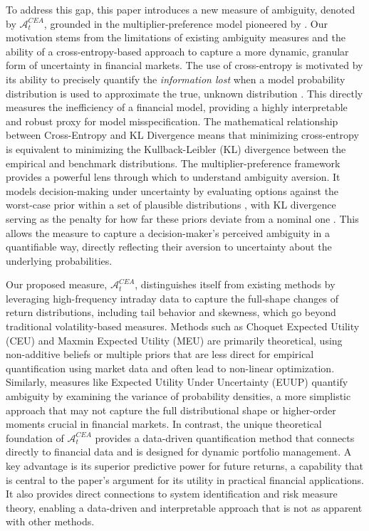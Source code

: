 \documentclass[preprint,12pt,authoryear]{elsarticle}
\begin{document}
To address this gap, this paper introduces a new measure of ambiguity, denoted by $\mathcal{A}^{CEA}_t$, grounded in the multiplier-preference model pioneered by \cite{hansen2001}. Our motivation stems from the limitations of existing ambiguity measures and the ability of a cross-entropy-based approach to capture a more dynamic, granular form of uncertainty in financial markets. The use of cross-entropy is motivated by its ability to precisely quantify the \textit{information lost} when a model probability distribution is used to approximate the true, unknown distribution \cite{klibanoff2005}. This directly measures the inefficiency of a financial model, providing a highly interpretable and robust proxy for model misspecification. The mathematical relationship between Cross-Entropy and KL Divergence \cite{mackay2003information} means that minimizing cross-entropy is equivalent to minimizing the Kullback-Leibler (KL) divergence between the empirical and benchmark distributions. The multiplier-preference framework \cite{epstein2008} provides a powerful lens through which to understand ambiguity aversion. It models decision-making under uncertainty by evaluating options against the worst-case prior within a set of plausible distributions \cite{maccheroni2006}, with KL divergence serving as the penalty for how far these priors deviate from a nominal one \cite{epstein2008}. This allows the measure to capture a decision-maker's perceived ambiguity in a quantifiable way, directly reflecting their aversion to uncertainty about the underlying probabilities.

Our proposed measure, $\mathcal{A}^{CEA}_t$, distinguishes itself from existing methods by leveraging high-frequency intraday data to capture the full-shape changes of return distributions, including tail behavior and skewness, which go beyond traditional volatility-based measures. Methods such as Choquet Expected Utility (CEU)  and Maxmin Expected Utility (MEU)  are primarily theoretical, using non-additive beliefs or multiple priors that are less direct for empirical quantification using market data and often lead to non-linear optimization. Similarly, measures like Expected Utility Under Uncertainty (EUUP)  quantify ambiguity by examining the variance of probability densities, a more simplistic approach that may not capture the full distributional shape or higher-order moments crucial in financial markets. In contrast, the unique theoretical foundation of $\mathcal{A}^{CEA}_t$ provides a data-driven quantification method that connects directly to financial data and is designed for dynamic portfolio management. A key advantage is its superior predictive power for future returns, a capability that is central to the paper's argument for its utility in practical financial applications. It also provides direct connections to system identification and risk measure theory, enabling a data-driven and interpretable approach that is not as apparent with other methods.
\end{document}
